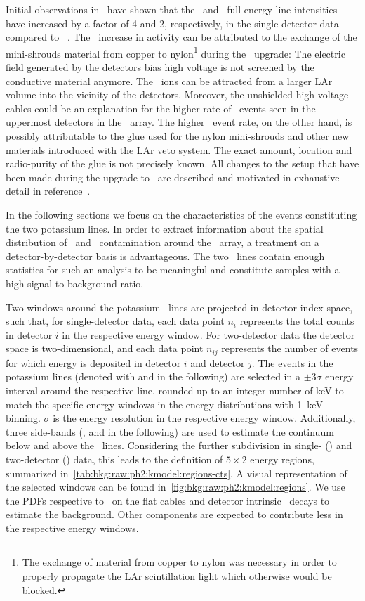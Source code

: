 Initial observations in \phasetwo\ have shown that the \kvn\ and \kvz\ full-energy line
intensities have increased by a factor of 4 and 2, respectively, in the single-detector
data compared to \phaseone~\cite{DAndrea2017}. The \kvz\ increase in activity can be
attributed to the exchange of the mini-shrouds material from copper to nylon\footnote{The
exchange of material from copper to nylon was necessary in order to properly propagate the
LAr scintillation light which otherwise would be blocked.} during the \phasetwo\ upgrade:
The electric field generated by the detectors bias high voltage is not screened by the
conductive material anymore. The \kvz\ ions can be attracted from a larger LAr volume into
the vicinity of the detectors.  Moreover, the unshielded high-voltage cables could be an
explanation for the higher rate of \kvz\ events seen in the uppermost detectors in the
\gerda\ array. The higher \kvn\ event rate, on the other hand, is possibly attributable to
the glue used for the nylon mini-shrouds and other new materials introduced with the LAr
veto system. The exact amount, location and radio-purity of the glue is not precisely
known.  All changes to the setup that have been made during the upgrade to \phasetwo\ are
described and motivated in exhaustive detail in reference~\cite{Agostini2018a}.

In the following sections we focus on the characteristics of the events constituting the
two potassium lines. In order to extract information about the spatial distribution of
\kvn\ and \kvz\ contamination around the \gerda\ array, a treatment on a
detector-by-detector basis is advantageous. The two \g\ lines contain enough statistics
for such an analysis to be meaningful and constitute samples with a high signal to
background ratio.

Two windows around the potassium \g\ lines are projected in detector index space, such
that, for single-detector data, each data point $n_i$ represents the total counts in
detector $i$ in the respective energy window. For two-detector data the detector space is
two-dimensional, and each data point $n_{ij}$ represents the number of events for which
energy is deposited in detector $i$ and detector $j$.
\newpar
The events in the potassium lines (denoted with  and  in the following) are
selected in a $\pm3\sigma$ energy interval around the respective line, rounded up to an
integer number of keV to match the specific energy windows in the energy distributions
with 1~keV binning.  $\sigma$ is the energy resolution in the respective energy window.
Additionally, three side-bands (,  and  in the following) are used to
estimate the continuum below and above the \g\ lines. Considering the further subdivision
in single- () and two-detector () data, this leads to the definition of $5
\times 2$ energy regions, summarized in~\cref{tab:bkg:raw:ph2:kmodel:regions-cts}. A
visual representation of the selected windows can be found
in~\cref{fig:bkg:raw:ph2:kmodel:regions}. We use the PDFs respective to \Bih\ on the flat
cables and detector intrinsic \nnbb\ decays to estimate the background. Other components
are expected to contribute less in the respective energy windows.

